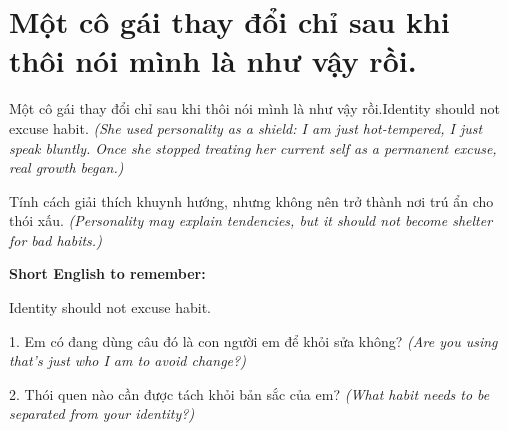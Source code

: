 \section{Một cô gái thay đổi chỉ sau khi thôi nói mình là như vậy rồi.}
\begin{truyen}{Một cô gái thay đổi chỉ sau khi thôi nói mình là như vậy rồi.}{Identity should not excuse habit.}
\textit{(She used personality as a shield: I am just hot-tempered, I just speak bluntly. Once she stopped treating her current self as a permanent excuse, real growth began.)}
\end{truyen}
\begin{baihoc}
Tính cách giải thích khuynh hướng, nhưng không nên trở thành nơi trú ẩn cho thói xấu.
\textit{(Personality may explain tendencies, but it should not become shelter for bad habits.)}
\end{baihoc}
\begin{ghinhoanh}\textbf{Short English to remember:}

Identity should not excuse habit.
\end{ghinhoanh}
\begin{tuhocnhanh}
1. Em có đang dùng câu đó là con người em để khỏi sửa không? \textit{(Are you using that's just who I am to avoid change?)}

2. Thói quen nào cần được tách khỏi bản sắc của em? \textit{(What habit needs to be separated from your identity?)}
\end{tuhocnhanh}
\ngancach

